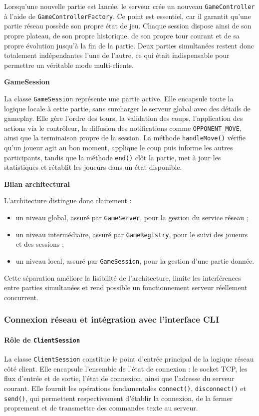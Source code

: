 \documentclass[a4paper]{article}
\begin{document}
Lorsqu'une nouvelle partie est lancée, le serveur crée un nouveau
\texttt{GameController} à l'aide de \texttt{GameControllerFactory}. Ce point est
essentiel, car il garantit qu'une partie réseau possède son propre état de jeu.
Chaque session dispose ainsi de son propre plateau, de son propre historique, de
son propre tour courant et de sa propre évolution jusqu'à la fin de la partie.
Deux parties simultanées restent donc totalement indépendantes l'une de l'autre,
ce qui était indispensable pour permettre un véritable mode multi-clients.

\medskip
\noindent\textbf{GameSession}

La classe \texttt{GameSession} représente une partie active. Elle encapsule
toute la logique locale à cette partie, sans surcharger le serveur global avec
des détails de gameplay. Elle gère l'ordre des tours, la validation des coups,
l'application des actions via le contrôleur, la diffusion des notifications
comme \texttt{OPPONENT\_MOVE}, ainsi que la terminaison propre de la session. La
méthode \texttt{handleMove()} vérifie qu'un joueur agit au bon moment, applique
le coup puis informe les autres participants, tandis que la méthode
\texttt{end()} clôt la partie, met à jour les statistiques et rétablit les
joueurs dans un état disponible.

\medskip
\noindent\textbf{Bilan architectural}

L'architecture distingue donc clairement :
\begin{itemize}
    \item un niveau global, assuré par \texttt{GameServer}, pour la gestion du
    service réseau ;
    \item un niveau intermédiaire, assuré par \texttt{GameRegistry}, pour le
    suivi des joueurs et des sessions ;
    \item un niveau local, assuré par \texttt{GameSession}, pour la gestion
    d'une partie donnée.
\end{itemize}

Cette séparation améliore la lisibilité de l'architecture, limite les
interférences entre parties simultanées et rend possible un fonctionnement
serveur réellement concurrent.

\subsubsection{Connexion réseau et intégration avec l'interface CLI}

\paragraph{Rôle de \texttt{ClientSession}}
La classe \texttt{ClientSession} constitue le point d'entrée principal de la
logique réseau côté client. Elle encapsule l'ensemble de l'état de connexion :
le socket TCP, les flux d'entrée et de sortie, l'état de connexion, ainsi que
l'adresse du serveur courant. Elle fournit les opérations fondamentales
\texttt{connect()}, \texttt{disconnect()} et \texttt{send()}, qui permettent
respectivement d'établir la connexion, de la fermer proprement et de
transmettre des commandes texte au serveur.
\end{document}
